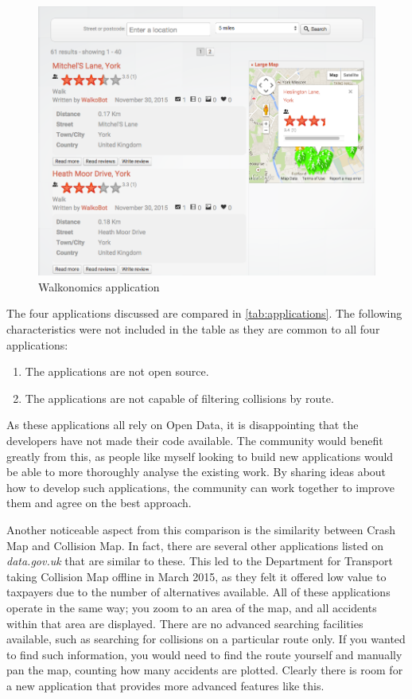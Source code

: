 \documentclass[authoryearcitations]{UoYCSproject}
\begin{document}
\begin{figure}
	\center
	\includegraphics[scale=0.4]{walkonomics}
	\caption{Walkonomics application}
	\label{fig:walkonomics}
\end{figure}

The four applications discussed are compared in \autoref{tab:applications}. The following characteristics were not included in the table as they are common to all four applications:

\begin{enumerate}
  \item The applications are not open source.
  \item The applications are not capable of filtering collisions by route.
\end{enumerate}

As these applications all rely on Open Data, it is disappointing that the developers have not made their code available. The community would benefit greatly from this, as people like myself looking to build new applications would be able to more thoroughly analyse the existing work. By sharing ideas about how to develop such applications, the community can work together to improve them and agree on the best approach.

Another noticeable aspect from this comparison is the similarity between Crash Map and Collision Map. In fact, there are several other applications listed on \textit{data.gov.uk} that are similar to these. This led to the Department for Transport taking Collision Map offline in March 2015, as they felt it offered low value to taxpayers due to the number of alternatives available.  All of these applications operate in the same way; you zoom to an area of the map, and all accidents within that area are displayed. There are no advanced searching facilities available, such as searching for collisions on a particular route only. If you wanted to find such information, you would need to find the route yourself and manually pan the map, counting how many accidents are plotted. Clearly there is room for a new application that provides more advanced features like this.  
\end{document}
